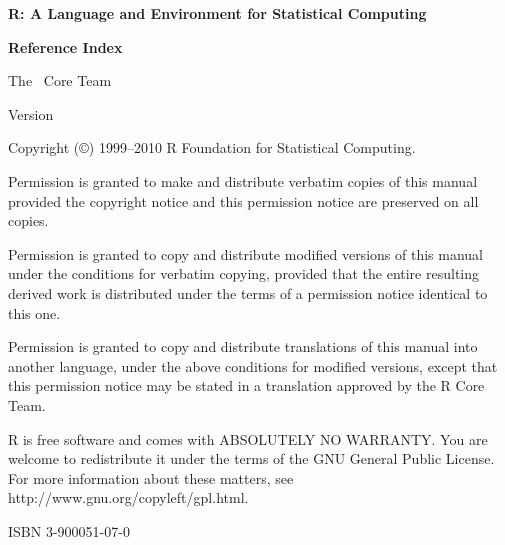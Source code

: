 \documentclass[a4paper]{book}
\begin{document}

\begin{titlepage}
  \strut\vfill

  \begin{center}
    \Huge
    \textbf{R: A Language and Environment for Statistical Computing}

    \LARGE
    \par\vspace*{6\medskipamount}
    \textbf{Reference Index}

    \par\vspace*{6\medskipamount}
    The \R\ Core Team

    \large
    \par\vspace*{3\medskipamount}
    Version 
  \end{center}

  \vfill
  \vfill
  \noindent
  Copyright ({\copyright}) 1999--2010 R Foundation for Statistical Computing.
  
  \noindent
  Permission is granted to make and distribute verbatim copies of this
  manual provided the copyright notice and this permission notice are
  preserved on all copies.
  
  \noindent
  Permission is granted to copy and distribute modified versions of this
  manual under the conditions for verbatim copying, provided that the
  entire resulting derived work is distributed under the terms of a
  permission notice identical to this one.
  
  \noindent
  Permission is granted to copy and distribute translations of this manual
  into another language, under the above conditions for modified versions,
  except that this permission notice may be stated in a translation
  approved by the R Core Team.
  
  \par\bigskip\noindent
  R is free software and comes with ABSOLUTELY NO WARRANTY.  You are
  welcome to redistribute it under the terms of the GNU General Public
  License.  For more information about these matters, see
  \textsf{http://www.gnu.org/copyleft/gpl.html}.
  \par\bigskip\noindent
  ISBN 3-900051-07-0
\end{titlepage}

\tableofcontents
\cleardoublepage














\cleardoublepage
\printindex
\end{document}

